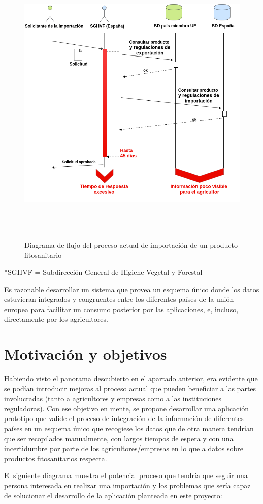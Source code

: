 \begin{figure}[H]
    \centering
    \includegraphics[width=1\textwidth,height=14cm]{Imagenes/Diagrama_de_flujo_proceso_actual_de_importacion_producto_fitosanitario}
    \caption{Diagrama de flujo del proceso actual de importación de un producto fitosanitario}
    \label{fig:flujo_actual_importacion}
\end{figure}
\par
*SGHVF = Subdirección General de Higiene Vegetal y Forestal\\\par
Es razonable desarrollar un sistema que provea un esquema único donde los datos estuvieran integrados y congruentes entre los diferentes países de la unión europea para facilitar un consumo posterior por las aplicaciones, e, incluso, directamente por los agricultores. 

\section{Motivación y objetivos} \label{phytoscheme.motivacion}
Habiendo visto el panorama descubierto en el apartado anterior, era evidente que se podían introducir mejoras al proceso actual que pueden beneficiar a las partes involucradas (tanto a agricultores y empresas como a las instituciones reguladoras). Con ese objetivo en mente, se propone desarrollar una aplicación prototipo que valide el proceso de integración de la información de diferentes países en un esquema único que recogiese los datos que de otra manera tendrían que ser recopilados manualmente, con largos tiempos de espera y con una incertidumbre por parte de los agricultores/empresas en lo que a datos sobre productos fitosanitarios respecta.\par 
El siguiente diagrama muestra el potencial proceso que tendría que seguir una persona interesada en realizar una importación y los problemas que sería capaz de solucionar el desarrollo de la aplicación planteada en este proyecto:


